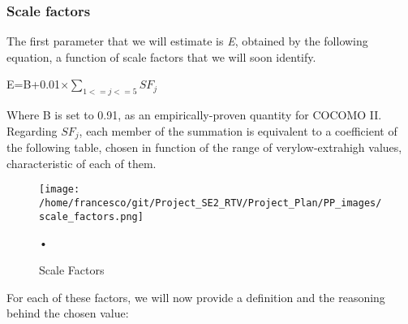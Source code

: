 \documentclass[10pt, a4paper,titlepage]{article}
\begin{document}
\subsubsection{Scale factors}
The first parameter that we will estimate is \emph{E}, obtained by the following equation, a function of scale factors that we will soon identify.
\begin{center}
E=B+0.01$\times\sum_{1<=j<=5}SF_j$
\end{center}
Where B is set to 0.91, as an empirically-proven quantity for COCOMO II.
Regarding $SF_j$, each member of the summation is equivalent to a coefficient of the following table, chosen in function of the range of verylow-extrahigh values, characteristic of each of them.
\begin{figure}[h]
\begin{center}
\texttt{[image: /home/francesco/git/Project\_SE2\_RTV/Project\_Plan/PP\_images/scale\_factors.png]}
\caption{Scale Factors}
\label{fig:scale}
\end{center}•
\end{figure}
\pagebreak
For each of these factors, we will now provide a definition and the reasoning behind the chosen value:
\end{document}
